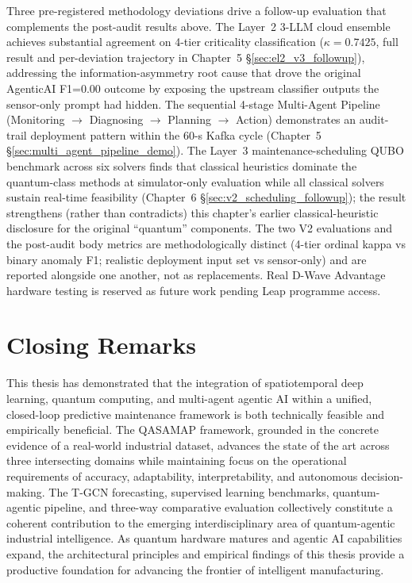 Three pre-registered methodology deviations drive a follow-up evaluation that complements the post-audit results above. The Layer~2 3-LLM cloud ensemble achieves substantial agreement on 4-tier criticality classification ($\kappa = 0.7425$, full result and per-deviation trajectory in Chapter~5 §\ref{sec:el2_v3_followup}), addressing the information-asymmetry root cause that drove the original AgenticAI F1=0.00 outcome by exposing the upstream classifier outputs the sensor-only prompt had hidden. The sequential 4-stage Multi-Agent Pipeline (Monitoring $\to$ Diagnosing $\to$ Planning $\to$ Action) demonstrates an audit-trail deployment pattern within the 60-s Kafka cycle (Chapter~5 §\ref{sec:multi_agent_pipeline_demo}). The Layer~3 maintenance-scheduling QUBO benchmark across six solvers finds that classical heuristics dominate the quantum-class methods at simulator-only evaluation while all classical solvers sustain real-time feasibility (Chapter~6 §\ref{sec:v2_scheduling_followup}); the result strengthens (rather than contradicts) this chapter's earlier classical-heuristic disclosure for the original ``quantum'' components. The two V2 evaluations and the post-audit body metrics are methodologically distinct (4-tier ordinal kappa vs binary anomaly F1; realistic deployment input set vs sensor-only) and are reported alongside one another, not as replacements. Real D-Wave Advantage hardware testing is reserved as future work pending Leap programme access.

\section{Closing Remarks}

This thesis has demonstrated that the integration of spatiotemporal deep learning, quantum computing, and multi-agent agentic AI within a unified, closed-loop predictive maintenance framework is both technically feasible and empirically beneficial. The QASAMAP framework, grounded in the concrete evidence of a real-world industrial dataset, advances the state of the art across three intersecting domains while maintaining focus on the operational requirements of accuracy, adaptability, interpretability, and autonomous decision-making. The T-GCN forecasting, supervised learning benchmarks, quantum-agentic pipeline, and three-way comparative evaluation collectively constitute a coherent contribution to the emerging interdisciplinary area of quantum-agentic industrial intelligence. As quantum hardware matures and agentic AI capabilities expand, the architectural principles and empirical findings of this thesis provide a productive foundation for advancing the frontier of intelligent manufacturing.